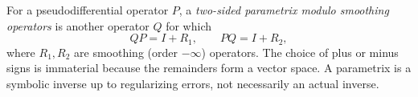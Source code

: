 
For a pseudodifferential operator $P$, a \emph{two-sided parametrix modulo smoothing operators} is another operator $Q$ for which
\[
QP=I+R_1,\qquad PQ=I+R_2,
\]
where $R_1,R_2$ are smoothing (order $-\infty$) operators. The choice of plus or minus signs is immaterial because the remainders form a vector space. A parametrix is a symbolic inverse up to regularizing errors, not necessarily an actual inverse.

